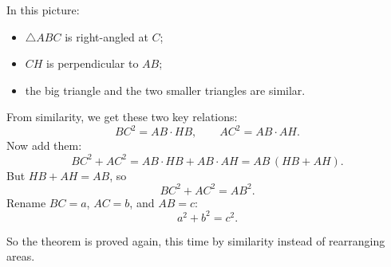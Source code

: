 \begin{center}
\end{center}

\noindent
In this picture:
\begin{itemize}
  \item \(\triangle ABC\) is right-angled at \(C\);
  \item \(CH\) is perpendicular to \(AB\);
  \item the big triangle and the two smaller triangles are similar.
\end{itemize}

From similarity, we get these two key relations:
\[
BC^2=AB\cdot HB,\qquad AC^2=AB\cdot AH.
\]
Now add them:
\[
BC^2+AC^2=AB\cdot HB+AB\cdot AH
=AB\,(HB+AH).
\]
But \(HB+AH=AB\), so
\[
BC^2+AC^2=AB^2.
\]
Rename \(BC=a\), \(AC=b\), and \(AB=c\):
\[
a^2+b^2=c^2.
\]

So the theorem is proved again, this time by similarity instead of rearranging
areas.

